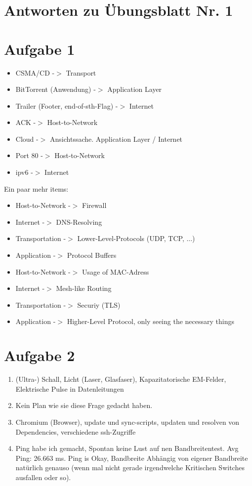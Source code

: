 \documentclass{scrartcl}
\begin{document}
\section*{Antworten zu Übungsblatt Nr. 1}

\section*{Aufgabe 1}

\begin{itemize}
    \item CSMA/CD -$>$ Transport
    \item BitTorrent (Anwendung) -$>$ Application Layer
    \item Trailer (Footer, end-of-sth-Flag) -$>$ Internet
    \item ACK -$>$ Host-to-Network
    \item Cloud -$>$ Ansichtssache. Application Layer / Internet
    \item Port 80 -$>$ Host-to-Network
    \item ipv6 -$>$ Internet
\end{itemize}

Ein paar mehr items:

\begin{itemize}
    \item Host-to-Network -$>$ Firewall
    \item Internet -$>$ DNS-Resolving
    \item Transportation -$>$ Lower-Level-Protocols (UDP, TCP, ...)
    \item Application -$>$ Protocol Buffers
    \item Host-to-Network -$>$ Usage of MAC-Adress
    \item Internet -$>$ Mesh-like Routing
    \item Transportation -$>$ Securiy (TLS)
    \item Application -$>$ Higher-Level Protocol, only seeing the necessary things
\end{itemize}



\section*{Aufgabe 2}


\begin{enumerate}
    \item (Ultra-) Schall, Licht (Laser, Glasfaser), Kapazitatorische EM-Felder, Elektrische Pulse in Datenleitungen
    \item Kein Plan wie sie diese Frage gedacht haben.
    \item Chromium (Browser), update und sync-scripts, updaten und resolven von Dependencies, verschiedene ssh-Zugriffe
    \item Ping habe ich gemacht, Spontan keine Lust auf nen Bandbreitentest. Avg Ping: 26.663 ms. Ping is Okay, Bandbreite Abhängig von eigener Bandbreite natürlich genauso (wenn mal nicht gerade irgendwelche Kritischen Switches ausfallen oder so).
\end{enumerate}
\end{document}
